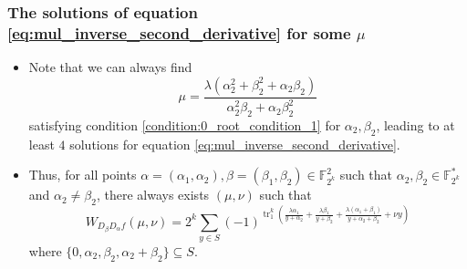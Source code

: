 \documentclass[
    aspectratio=169,                   %
]{beamer}
\newcommand{\Fks}{\mathbb{F}_{2^k}^*}
\newcommand{\Fk}{\mathbb{F}_{2^k}}
\newcommand{\tr}{\operatorname{tr}_1^k}
\begin{document}
    \begin{frame}
        \frametitle{The solutions of equation \eqref{eq:mul_inverse_second_derivative} for some $ \mu $}
    
        \begin{itemize}
            \item Note that we can always find 
            \[ \mu=\frac{\lambda(\alpha_2^2+\beta_2^2+\alpha_2\beta_2)}{\alpha_2^2\beta_2+\alpha_2\beta_2^2} \] 
            satisfying condition \eqref{condition:0_root_condition_1} for $ \alpha_2,\beta_2 $, leading to at least $ 4 $ solutions 
            for equation \eqref{eq:mul_inverse_second_derivative}. 
            
            \item Thus, for all points $ \alpha=(\alpha_1,\alpha_2),\beta=(\beta_1,\beta_2)\in\Fk^2 $ such that $ \alpha_2,\beta_2\in\Fks $ 
            and $ \alpha_2\ne\beta_2 $, there always exists $ (\mu,\nu) $ such that 
            \[W_{D_{\beta}D_{\alpha}f}(\mu,\nu) = 2^k\sum_{y\in S}(-1)^{\tr\left(\frac{\lambda\alpha_1}{y+\alpha_2}+\frac{\lambda\beta_1}{y+\beta_2}+\frac{\lambda(\alpha_1+\beta_1)}{y+\alpha_2+\beta_2}+\nu y\right)}\]
            where $ \{0,\alpha_2,\beta_2,\alpha_2+\beta_2\}\subseteq S $.
        \end{itemize}

    
    \end{frame}
\end{document}
